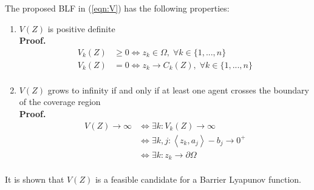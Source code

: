 \documentclass[journal]{IEEEtran}
\newcommand*{\txtspc}[1]{#1\phantom{.}}%
\begin{document}
\noindent The proposed BLF in (\ref{eqn:V}) has the following properties: 
\begin{enumerate}
	\item $ V(Z) $ is positive definite \\
	\textbf{Proof.}
	\begin{equation}
	\begin{split}
	V_k(Z) & \geq 0 \iff z_k \in \Omega \txtspc{,} \forall  k \in \{1,...,n\} \\
	V_k(Z) & = 0  \iff z_k \rightarrow C_k(Z) \txtspc{,} \forall  k \in \{1,...,n\}\\
	\end{split}
	\end{equation}
	\item $ V(Z) $ grows to infinity if and only if at least one agent crosses the boundary of the coverage region \\
	\textbf{Proof.}
	\begin{equation}
	\begin{split}
	V(Z) \xrightarrow{} \infty & \iff \exists k : V_k(Z) \xrightarrow{} \infty \\
	& \iff \exists k,j : \left<z_k, a_j \right> - b_j \xrightarrow{}{0^+} \\
	& \iff \exists k : z_k \rightarrow \partial \Omega \\
	\end{split}
	\end{equation}
\end{enumerate}
\noindent It is shown that $V(Z)$ is a feasible candidate for a Barrier Lyapunov function.

\end{document}
